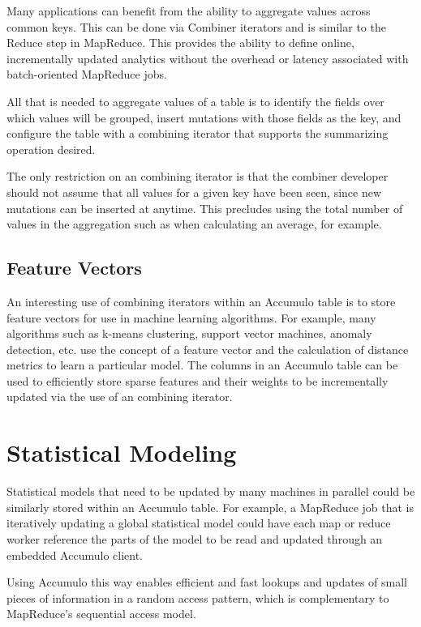 Many applications can benefit from the ability to aggregate values across common
keys. This can be done via Combiner iterators and is similar to the Reduce step in
MapReduce. This provides the ability to define online, incrementally updated
analytics without the overhead or latency associated with batch-oriented
MapReduce jobs.

All that is needed to aggregate values of a table is to identify the fields over which
values will be grouped, insert mutations with those fields as the key, and configure
the table with a combining iterator that supports the summarizing operation
desired.

The only restriction on an combining iterator is that the combiner developer
should not assume that all values for a given key have been seen, since new
mutations can be inserted at anytime. This precludes using the total number of
values in the aggregation such as when calculating an average, for example.

\subsection{Feature Vectors}

An interesting use of combining iterators within an Accumulo table is to store
feature vectors for use in machine learning algorithms. For example, many
algorithms such as k-means clustering, support vector machines, anomaly detection,
etc. use the concept of a feature vector and the calculation of distance metrics to
learn a particular model. The columns in an Accumulo table can be used to efficiently
store sparse features and their weights to be incrementally updated via the use of an
combining iterator.

\section{Statistical Modeling}

Statistical models that need to be updated by many machines in parallel could be
similarly stored within an Accumulo table. For example, a MapReduce job that is
iteratively updating a global statistical model could have each map or reduce worker
reference the parts of the model to be read and updated through an embedded
Accumulo client.

Using Accumulo this way enables efficient and fast lookups and updates of small
pieces of information in a random access pattern, which is complementary to
MapReduce's sequential access model.

